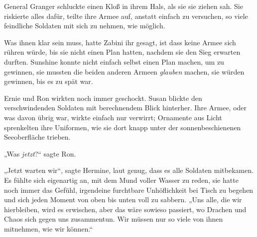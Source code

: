 General Granger schluckte einen Kloß in ihrem Hals, als sie sie ziehen sah. Sie riskierte alles dafür, teilte ihre Armee auf, anstatt einfach zu versuchen, so viele feindliche Soldaten mit sich zu nehmen, wie möglich.

Was ihnen klar sein muss, hatte Zabini ihr gesagt, ist dass keine Armee sich rühren würde, bis sie nicht einen Plan hatten, nachdem sie den Sieg erwarten durften. Sunshine konnte nicht einfach selbst einen Plan machen, um zu gewinnen, sie mussten die beiden anderen Armeen \emph{glauben} machen, sie würden gewinnen, bis es zu spät war.

Ernie und Ron wirkten noch immer geschockt. Susan blickte den verschwindenden Soldaten mit berechnendem Blick hinterher. Ihre Armee, oder was davon übrig war, wirkte einfach nur verwirrt; Ornamente aus Licht sprenkelten ihre Uniformen, wie sie dort knapp unter der sonnenbeschienenen Seeoberfläche trieben.

„Was \emph{jetzt}?“ sagte Ron.

„Jetzt warten wir“, sagte Hermine, laut genug, dass es alle Soldaten mitbekamen. Es fühlte sich eigenartig an, mit dem Mund voller Wasser zu reden, sie hatte noch immer das Gefühl, irgendeine furchtbare Unhöflichkeit bei Tisch zu begehen und sich jeden Moment von oben bis unten voll zu sabbern.
„Uns alle, die wir hierbleiben, wird es erwischen, aber das wäre sowieso passiert, wo Drachen und Chaos sich gegen uns zusammentun. Wir müssen nur so viele von ihnen mitnehmen, wie wir können.“

